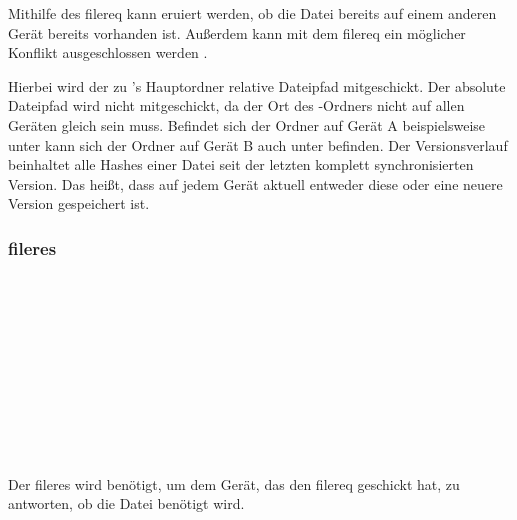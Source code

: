 	\begin{rightwordgroup}{\isprotomsgdata}
		 \\
		\skippedwords \\
		 \\
		 \\
		\skippedwords \\
	\end{rightwordgroup}
Mithilfe des \gls{filereq} kann eruiert werden, ob die Datei bereits auf einem anderen Gerät bereits vorhanden ist. Außerdem kann mit dem \gls{filereq} ein möglicher Konflikt  ausgeschlossen werden .

\begin{description} 
		Hierbei wird der zu \sblit's Hauptordner relative Dateipfad mitgeschickt. Der absolute Dateipfad wird nicht mitgeschickt, da der Ort des \sblit-Ordners nicht auf allen Geräten gleich sein muss. Befindet sich der Ordner auf Gerät A beispielsweise unter  kann sich der Ordner auf Gerät B auch unter  befinden.
		Der Versionsverlauf beinhaltet alle Hashes einer Datei seit der letzten komplett synchronisierten Version. Das heißt, dass auf jedem Gerät aktuell entweder diese oder eine neuere Version gespeichert ist.
\end{description}

		
\subsubsection{\gls{fileres}} \label{fileres}

\messagestart
	 \\
	
	\begin{rightwordgroup}{\isprotomsgtype}
	\end{rightwordgroup} \\
	
	\begin{rightwordgroup}{\isprotomsgdata}
		 \\
		 \\
		\skippedwords \\
		 \\
		 \\
		\skippedwords \\
	\end{rightwordgroup}
Der \gls{fileres} wird benötigt, um dem Gerät, das den \gls{filereq} geschickt hat, zu antworten, ob die Datei benötigt wird.

